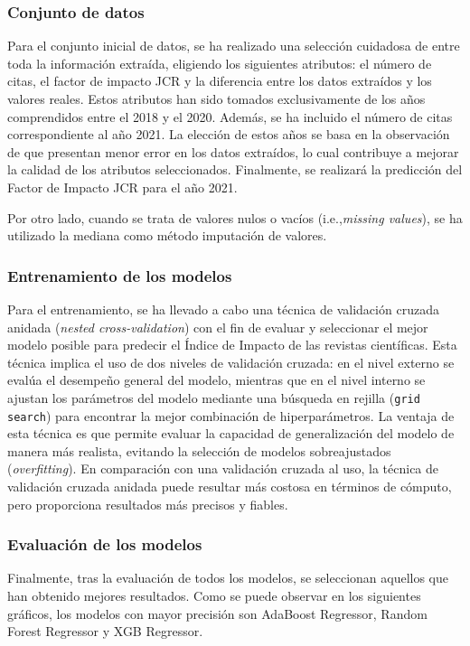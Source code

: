 \subsubsection{Conjunto de datos}
Para el conjunto inicial de datos, se ha realizado una selección cuidadosa de entre toda la información extraída, eligiendo los siguientes atributos: el número de citas, el factor de impacto JCR y la diferencia entre los datos extraídos y los valores reales. Estos atributos han sido tomados exclusivamente de los años comprendidos entre el 2018 y el 2020. Además, se ha incluido el número de citas correspondiente al año 2021. La elección de estos años se basa en la observación de que presentan menor error en los datos extraídos, lo cual contribuye a mejorar la calidad de los atributos seleccionados. Finalmente, se realizará la predicción del Factor de Impacto JCR para el año 2021.


Por otro lado, cuando se trata de valores nulos o vacíos (i.e.,\textit{missing values}), se ha utilizado la mediana como método imputación de valores.

\subsubsection{Entrenamiento de los modelos}
Para el entrenamiento, se ha llevado a cabo una técnica de validación cruzada anidada (\textit{nested cross-validation}) con el fin de evaluar y seleccionar el mejor modelo posible para predecir el Índice de Impacto de las revistas científicas. Esta técnica implica el uso de dos niveles de validación cruzada: en el nivel externo se evalúa el desempeño general del modelo, mientras que en el nivel interno se ajustan los parámetros del modelo mediante una búsqueda en rejilla (\texttt{grid search}) para encontrar la mejor combinación de hiperparámetros. La ventaja de esta técnica es que permite evaluar la capacidad de generalización del modelo de manera más realista, evitando la selección de modelos sobreajustados (\textit{overfitting}). En comparación con una validación cruzada al uso, la técnica de validación cruzada anidada puede resultar más costosa en términos de cómputo, pero proporciona resultados más precisos y fiables.


\subsubsection{Evaluación de los modelos}
Finalmente, tras la evaluación de todos los modelos, se seleccionan aquellos que han obtenido mejores resultados. Como se puede observar en los siguientes gráficos, los modelos con mayor precisión son AdaBoost Regressor, Random Forest Regressor y XGB Regressor.

